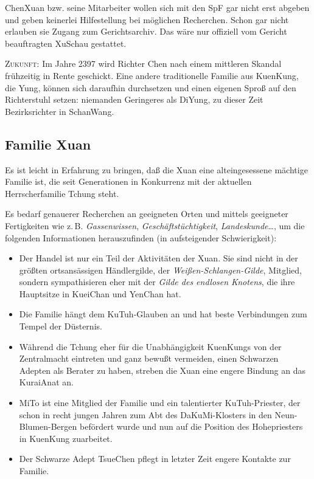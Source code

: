 \documentclass[
a4paper,
twoside,
DIV=calc,
BCOR=4mm,
fontsize=9pt,
twocolumn=on,
titlepage=on,
parskip=half
]{scrartcl}
\begin{document}
ChenXuan bzw. seine Mitarbeiter wollen sich mit den SpF gar nicht erst
abgeben und geben keinerlei Hilfestellung bei möglichen
Recherchen. Schon gar nicht erlauben sie Zugang zum
Gerichtsarchiv. Das wäre nur offiziell vom Gericht beauftragten
XuSchau gestattet.

\textsc{Zukunft:} Im Jahre 2397 wird Richter Chen nach einem mittleren
Skandal frühzeitig in Rente geschickt. Eine andere traditionelle
Familie aus KuenKung, die Yung, können sich daraufhin durchsetzen und
einen eigenen Sproß auf den Richterstuhl setzen: niemanden Geringeres
als DiYung, zu dieser Zeit Bezirksrichter in SchanWang.

\subsection{Familie Xuan}

Es ist leicht in Erfahrung zu bringen, daß die Xuan eine
alteingesessene mächtige Familie ist, die seit Generationen in
Konkurrenz mit der aktuellen Herrscherfamilie Tchung steht.

Es bedarf genauerer Recherchen an geeigneten Orten und mittels
geeigneter Fertigkeiten wie z.\,B. \emph{Gassenwissen},
\emph{Geschäftstüchtigkeit}, \emph{Landeskunde}\dots, um die folgenden
Informationen herauszufinden (in aufsteigender Schwierigkeit):

\begin{itemize}
\item Der Handel ist nur ein Teil der Aktivitäten der Xuan. Sie sind
  nicht in der größten ortsansässigen Händlergilde, der
  \emph{Weißen-Schlangen-Gilde}, Mitglied, sondern sympathisieren eher
  mit der \emph{Gilde des endlosen Knotens}, die ihre Hauptsitze in
  KueiChan und YenChan hat.
\item Die Familie hängt dem KuTuh-Glauben an und hat beste
  Verbindungen zum Tempel der Düsternis.
\item Während die Tchung eher für die Unabhängigkeit KuenKungs von der
  Zentralmacht eintreten und ganz bewußt vermeiden, einen Schwarzen
  Adepten als Berater zu haben, streben die Xuan eine engere Bindung
  an das KuraiAnat an.
\item MiTo ist eine Mitglied der Familie und ein talentierter
  KuTuh-Priester, der schon in recht jungen Jahren zum Abt des
  DaKuMi-Klosters in den Neun-Blumen-Bergen befördert wurde und nun
  auf die Position des Hohepriesters in KuenKung zuarbeitet.
\item Der Schwarze Adept TsueChen pflegt in letzter Zeit engere
  Kontakte zur Familie.
\end{itemize}
\end{document}
